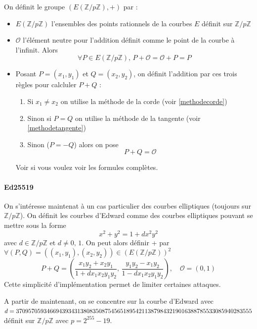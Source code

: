 \documentclass[a4paper, 12pt]{article}
\begin{document}
\noindent On définit le groupe $\left(E\left( \mathbb{Z}/p\mathbb{Z} \right), +\right)$ par :
\begin{itemize}
	\item $E\left( \mathbb{Z}/p\mathbb{Z} \right)$ l'ensembles des points rationnels de la courbes $E$ définit sur $\mathbb{Z}/p\mathbb{Z}$
	\item $\mathcal{O}$ l'élément neutre pour l'addition définit comme le point de la courbe à l'infinit. Alors
		$$
		\forall P \in E\left( \mathbb{Z}/p\mathbb{Z} \right), \, P + \mathcal{O} = \mathcal{O}+P=P
		$$
	\item Posant $P = (x_1, y_1)$ et $Q = (x_2, y_2)$, on définit l'addition par ces trois règles pour calcluler $P+Q$ :
	\begin{enumerate}
		\item Si $x_1 \neq x_2$ on utilise la méthode de la corde (voir \ref{methodecorde})
		\item Sinon si $P = Q$ on utilise la méthode de la tangente (voir \ref{methodetangente})
		\item Sinon ($P = -Q$) alors on pose 
		$$
		P+Q = \mathcal{O}
		$$
	\end{enumerate}
	Voir \cite{courslong} si vous voulez voir les formules complètes.
\end{itemize}


\paragraph{Ed25519}\label{courbeed}

On s'intéresse maintenat à un cas particulier des courbes elliptiques (toujours sur $ \mathbb{Z}/p\mathbb{Z}$). On définit les courbes d'Edward comme des courbes elliptiques pouvant se mettre sous la forme 
$$
x^2 + y^2 = 1 + dx^2y^2
$$
avec $d \in \mathbb{Z}/p\mathbb{Z}$ et $d \neq 0,\, 1$. On peut alors définir + par
$
\forall (P,Q) = ((x_1,y_1),(x_2,y_2)) \in \left(E\left( \mathbb{Z}/p\mathbb{Z} \right)\right)^2
$
$$
P + Q = \left(\frac{x_1y_2+x_2y_1}{1+dx_1x_2y_1y_2},\, \frac{y_1y_2-x_1y_2}{1-dx_1x_2y_1y_2}\right), \quad \mathcal{O} = \left(0,1\right) 
$$
Cette simplicité d'implémentation permet de limiter certaines attaques. 

A partir de maintenant, on se concentre sur la courbe d'Edward avec $d = 3709570\\59346694393431380835087545651895421138798432190163887855330859402\\83555$ définit sur $ \mathbb{Z}/p\mathbb{Z}$ avec $p = 2^{255}-19$.
\end{document}
